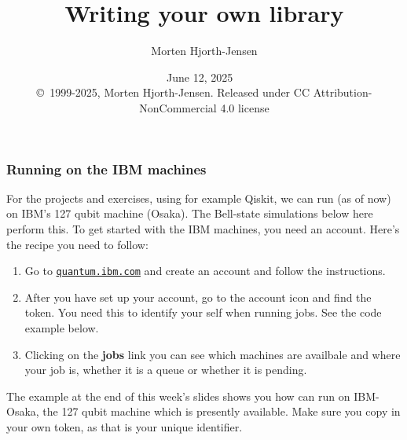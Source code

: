 \documentclass{beamer}
\begin{document}

\newcommand{\exercisesection}[1]{\subsection*{#1}}







\title{Writing your own library}


\author{Morten Hjorth-Jensen}

\date{June 12, 2025
\ \\ 
{\tiny \copyright\ 1999-2025, Morten Hjorth-Jensen. Released under CC Attribution-NonCommercial 4.0 license}
}

\begin{frame}
\titlepage
\end{frame}

\begin{frame}
\frametitle{Running on the IBM machines}

For the projects and exercises, using for example Qiskit, we can run (as of now) on IBM's 127 qubit machine (Osaka).
The Bell-state simulations below here perform this. To get started with the IBM machines, you need an account. Here's the recipe you need to follow:
\begin{enumerate}
\item Go to \href{{quantum.ibm.com}}{\nolinkurl{quantum.ibm.com}} and create an account and follow the instructions.

\item After you have set up your account, go to the account icon and find the token. You need this to identify your self when running jobs. See the code example below.

\item Clicking on the \textbf{jobs} link you can see which machines are availbale and where your job is, whether it is a queue or whether it is pending.
\end{enumerate}

\noindent
The example at the end of this week's slides shows you how can run on IBM-Osaka, the 127 qubit machine which is presently available.
Make sure you copy in your own token,  as that is your unique identifier.
\end{frame}
\end{document}
